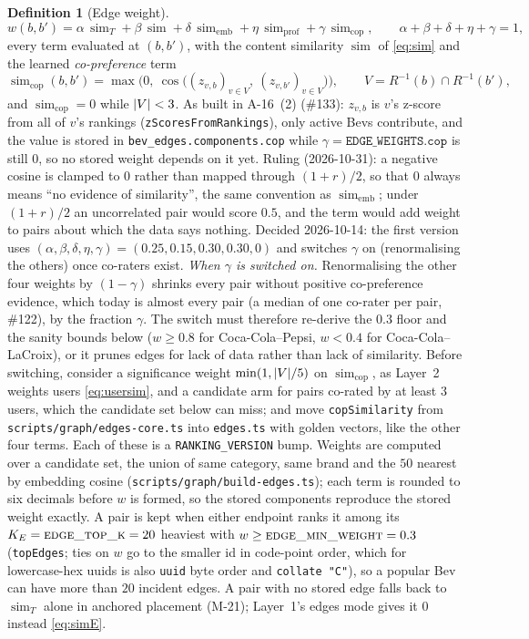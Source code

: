\documentclass[11pt]{article}
\DeclarePairedDelimiter\abs{\lvert}{\rvert}
\DeclareMathOperator{\simi}{sim}
\DeclareMathOperator{\cosim}{cos}
\newcommand{\code}[1]{\texttt{#1}}
\theoremstyle{plain}
\theoremstyle{definition}
\newtheorem{definition}[theorem]{Definition}
\theoremstyle{remark}
\begin{document}
\begin{definition}[Edge weight]
\begin{equation}\label{eq:w}
w(b, b') = \alpha\, \simi_T + \beta\, \simi + \delta\, \simi_{\mathrm{emb}} + \eta\, \simi_{\mathrm{prof}} + \gamma\, \simi_{\mathrm{cop}}, \qquad \alpha + \beta + \delta + \eta + \gamma = 1,
\end{equation}
every term evaluated at $(b, b')$, with the content similarity $\simi$ of \eqref{eq:sim} and the learned \emph{co-preference} term
\[
\simi_{\mathrm{cop}}(b, b') = \max\bigl(0,\ \cosim\bigl((z_{v,b})_{v \in V},\ (z_{v,b'})_{v \in V}\bigr)\bigr), \qquad V = R^{-1}(b) \cap R^{-1}(b'),
\]
and $\simi_{\mathrm{cop}} = 0$ while $\abs{V} < 3$. As built in A-16~(2) (\#133): $z_{v,b}$ is $v$'s z-score from all of $v$'s rankings (\code{zScoresFromRankings}), only active Bevs contribute, and the value is stored in \code{bev\_edges.components.cop} while $\gamma = \code{EDGE\_WEIGHTS.cop}$ is still $0$, so no stored weight depends on it yet. Ruling (2026-10-31): a negative cosine is clamped to $0$ rather than mapped through $(1 + r)/2$, so that $0$ always means ``no evidence of similarity'', the same convention as $\simi_{\mathrm{emb}}$; under $(1+r)/2$ an uncorrelated pair would score $0.5$, and the term would add weight to pairs about which the data says nothing. Decided 2026-10-14: the first version uses $(\alpha, \beta, \delta, \eta, \gamma) = (0.25, 0.15, 0.30, 0.30, 0)$ and switches $\gamma$ on (renormalising the others) once co-raters exist. \emph{When $\gamma$ is switched on.} Renormalising the other four weights by $(1 - \gamma)$ shrinks every pair without positive co-preference evidence, which today is almost every pair (a median of one co-rater per pair, \#122), by the fraction $\gamma$. The switch must therefore re-derive the $0.3$ floor and the sanity bounds below ($w \ge 0.8$ for Coca-Cola--Pepsi, $w < 0.4$ for Coca-Cola--LaCroix), or it prunes edges for lack of data rather than lack of similarity. Before switching, consider a significance weight $\min(1, \abs{V}/5)$ on $\simi_{\mathrm{cop}}$, as Layer~2 weights users \eqref{eq:usersim}, and a candidate arm for pairs co-rated by at least $3$ users, which the candidate set below can miss; and move \code{copSimilarity} from \code{scripts/graph/edges-core.ts} into \code{edges.ts} with golden vectors, like the other four terms. Each of these is a \code{RANKING\_VERSION} bump. Weights are computed over a candidate set, the union of same category, same brand and the $50$ nearest by embedding cosine (\code{scripts/graph/build-edges.ts}); each term is rounded to six decimals before $w$ is formed, so the stored components reproduce the stored weight exactly. A pair is kept when either endpoint ranks it among its $K_E = \textsc{edge\_top\_k} = 20$ heaviest with $w \ge \textsc{edge\_min\_weight} = 0.3$ (\code{topEdges}; ties on $w$ go to the smaller id in code-point order, which for lowercase-hex uuids is also \code{uuid} byte order and \code{collate "C"}), so a popular Bev can have more than $20$ incident edges. A pair with no stored edge falls back to $\simi_T$ alone in anchored placement (M-21); Layer~1's edges mode gives it $0$ instead \eqref{eq:simE}.
\end{definition}
\end{document}
